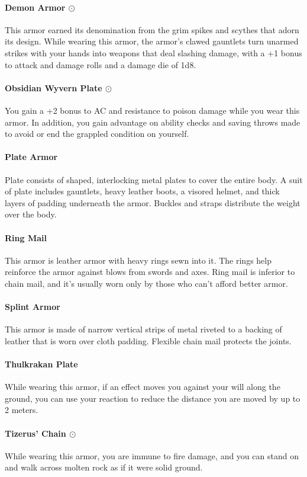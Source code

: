     \paragraph{Demon Armor $\odot$}
        This armor earned its denomination from the grim spikes and scythes that adorn its design.
        While wearing this armor, the armor's clawed gauntlets turn unarmed strikes with your hands into weapons that deal slashing damage, with a +1 bonus to attack and damage rolls and a damage die of 1d8.
    \paragraph{Obsidian Wyvern Plate $\odot$}
        You gain a +2 bonus to AC and resistance to poison damage while you wear this armor.
        In addition, you gain advantage on ability checks and saving throws made to avoid or end the grappled condition on yourself.
    \paragraph{Plate Armor}
        Plate consists of shaped, interlocking metal plates to cover the entire body.
        A suit of plate includes gauntlets, heavy leather boots, a visored helmet, and thick layers of padding underneath the armor.
        Buckles and straps distribute the weight over the body.
    \paragraph{Ring Mail}
        This armor is leather armor with heavy rings sewn into it.
        The rings help reinforce the armor against blows from swords and axes.
        Ring mail is inferior to chain mail, and it's usually worn only by those who can't afford better armor.
    \paragraph{Splint Armor}
        This armor is made of narrow vertical strips of metal riveted to a backing of leather that is worn over cloth padding.
        Flexible chain mail protects the joints.
    \paragraph{Thulkrakan Plate}
        While wearing this armor, if an effect moves you against your will along the ground, you can use your reaction to reduce the distance you are moved by up to 2 meters.
    \paragraph{Tizerus' Chain $\odot$}
        While wearing this armor, you are immune to fire damage, and you can stand on and walk across molten rock as if it were solid ground.
\newpage

